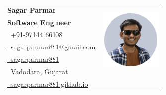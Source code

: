 \documentclass[a4paper,11pt]{article}
\makeatletter
\newcommand{\name}{Sagar Parmar} %
\newcommand{\role}{Software Engineer} %
\newcommand{\phone}{97144 66108} %
\newcommand{\emaila}{sagarparmar881@gmail.com} %
\newcommand{\home}{Vadodara, Gujarat} %
\newcommand{\website}{sagarparmar881.github.io} %
\makeatother
\begin{document}
\selectfont

{ \renewcommand{\arraystretch}{1.15}





\begin{tabularx}{\linewidth}{L r} \textbf{\LARGE \name}
\vspace{2mm} 
&  \\ %

\textbf{\normalsize \role} & \\
{\raisebox{0.0\height}{\footnotesize \faPhone}\ +91-\phone} & \\ %

\href{mailto:\emaila}{\raisebox{0.0\height}{\footnotesize
\faEnvelope}\ {\emaila}} & \\ %


\href{https://github.com/sagarparmar881}{\raisebox{0.0\height}{\footnotesize
\faGithub}\ {sagarparmar881}} & \\ %

{\raisebox{0.0\height}{\footnotesize \faHome}\ \home} & \\ %

\href{https://sagarparmar881.github.io/}{\raisebox{0.0\height}{\footnotesize
\faGlobe}\ \website} & \\ \end{tabularx}  %

}


\end{document}
